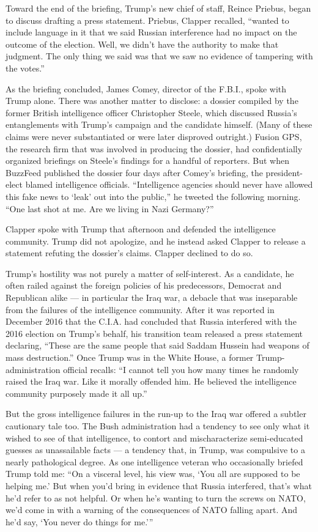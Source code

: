 Toward the end of the briefing, Trump's new chief of staff, Reince
Priebus, began to discuss drafting a press statement. Priebus, Clapper
recalled, ``wanted to include language in it that we said Russian
interference had no impact on the outcome of the election. Well, we
didn't have the authority to make that judgment. The only thing we said
was that we saw no evidence of tampering with the votes.''

As the briefing concluded, James Comey, director of the F.B.I., spoke
with Trump alone. There was another matter to disclose: a dossier
compiled by the former British intelligence officer Christopher Steele,
which discussed Russia's entanglements with Trump's campaign and the
candidate himself. (Many of these claims were never substantiated or
were later disproved outright.) Fusion GPS, the research firm that was
involved in producing the dossier, had confidentially organized
briefings on Steele's findings for a handful of reporters. But when
BuzzFeed published the dossier four days after Comey's briefing, the
president-elect blamed intelligence officials. ``Intelligence agencies
should never have allowed this fake news to `leak' out into the
public,'' he tweeted the following morning. ``One last shot at me. Are
we living in Nazi Germany?''

Clapper spoke with Trump that afternoon and defended the intelligence
community. Trump did not apologize, and he instead asked Clapper to
release a statement refuting the dossier's claims. Clapper declined to
do so.

Trump's hostility was not purely a matter of self-interest. As a
candidate, he often railed against the foreign policies of his
predecessors, Democrat and Republican alike --- in particular the Iraq
war, a debacle that was inseparable from the failures of the
intelligence community. After it was reported in December 2016 that the
C.I.A. had concluded that Russia interfered with the 2016 election on
Trump's behalf, his transition team released a press statement
declaring, ``These are the same people that said Saddam Hussein had
weapons of mass destruction.'' Once Trump was in the White House, a
former Trump-administration official recalls: ``I cannot tell you how
many times he randomly raised the Iraq war. Like it morally offended
him. He believed the intelligence community purposely made it all up.''

But the gross intelligence failures in the run-up to the Iraq war
offered a subtler cautionary tale too. The Bush administration had a
tendency to see only what it wished to see of that intelligence, to
contort and mischaracterize semi-educated guesses as unassailable facts
--- a tendency that, in Trump, was compulsive to a nearly pathological
degree. As one intelligence veteran who occasionally briefed Trump told
me: ``On a visceral level, his view was, `You all are supposed to be
helping me.' But when you'd bring in evidence that Russia interfered,
that's what he'd refer to as not helpful. Or when he's wanting to turn
the screws on NATO, we'd come in with a warning of the consequences of
NATO falling apart. And he'd say, `You never do things for me.'''

